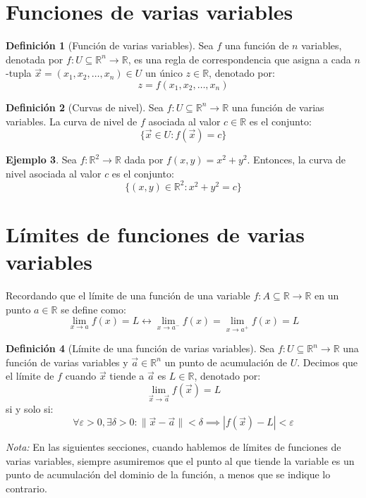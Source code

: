 \documentclass{article}
\newcommand{\R}{\mathbb{R}}
\newcommand{\vect}[1]{\vec{#1}}
\newcommand{\norm}[1]{\| #1 \|}
\theoremstyle{definition}
\newtheorem{definition}{Definición}[section]
\newtheorem{example}[definition]{Ejemplo}
\theoremstyle{plain}
\theoremstyle{remark}
\theoremstyle{corollary}
\begin{document}
\section{Funciones de varias variables}

\begin{definition}[Función de varias variables]

Sea $f$ una función de $n$ variables, denotada por $f : U \subseteq \R^n \to \R$, es una regla de correspondencia que asigna a cada $n$-tupla $\vect{x} = (x_1, x_2, \dots, x_n) \in U$ un único $z \in \R$, denotado por:
\[
z = f(x_1, x_2, \dots, x_n)
\]
\end{definition}

\begin{definition}[Curvas de nivel]

Sea $f : U \subseteq \R^n \to \R$ una función de varias variables. La curva de nivel de $f$ asociada al valor $c \in \R$ es el conjunto:
\[
\{ \vect{x} \in U : f(\vect{x}) = c \}
\]
\end{definition}

\begin{example}
Sea $f : \R^2 \to \R$ dada por $f(x, y) = x^2 + y^2$. Entonces, la curva de nivel asociada al valor $c$ es el conjunto:
\[
\{ (x, y) \in \R^2 : x^2 + y^2 = c \}
\]
\end{example}

\section{Límites de funciones de varias variables}

Recordando que el límite de una función de una variable $f : A \subseteq \R \to \R$ en un punto $a \in \R$ se define como:
\[
\lim_{x \to a} f(x) = L  \leftrightarrow \lim_{x \to a^-} f(x) = \lim_{x \to a^+} f(x) = L
\]

\begin{definition}[Límite de una función de varias variables]

Sea $f : U \subseteq \R^n \to \R$ una función de varias variables y $\vect{a} \in \R^n$ un punto de acumulación de $U$. Decimos que el límite de $f$ cuando $\vect{x}$ tiende a $\vect{a}$ es $L \in \R$, denotado por:
\[
\lim_{\vect{x} \to \vect{a}} f(\vect{x}) = L
\]
si y solo si:
\[
\forall \varepsilon > 0, \exists \delta > 0 : \norm{\vect{x} - \vect{a}} < \delta \implies |f(\vect{x}) - L| < \varepsilon
\]
\end{definition}

\textit{Nota:}
En las siguientes secciones, cuando hablemos de límites de funciones de varias variables, siempre asumiremos que el punto al que tiende la variable es un punto de acumulación del dominio de la función, a menos que se indique lo contrario.
\end{document}
